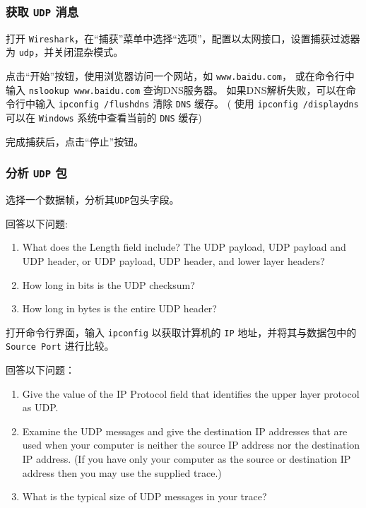 \documentclass{article}
\begin{document}
	\subsubsection{获取 \texttt{UDP} 消息}
	
	打开 \texttt{Wireshark}，在“捕获”菜单中选择“选项”，配置以太网接口，设置捕获过滤器为 \texttt{udp}，并关闭混杂模式。
	
	点击“开始”按钮，使用浏览器访问一个网站，如 \texttt{www.baidu.com}，
	或在命令行中输入 \texttt{nslookup www.baidu.com} 查询DNS服务器。
	如果DNS解析失败，可以在命令行中输入 \texttt{ipconfig /flushdns} 清除 \texttt{DNS} 缓存。
	( 使用 \texttt{ipconfig /displaydns} 可以在 \texttt{Windows} 系统中查看当前的 \texttt{DNS} 缓存)
	
	完成捕获后，点击“停止”按钮。
	
	\subsubsection{分析 \texttt{UDP} 包}
	选择一个数据帧，分析其\texttt{UDP}包头字段。
	
	回答以下问题:
	
	\begin{enumerate}[label={\arabic*})]
		\item What does the Length field include? The UDP payload, UDP payload and UDP header, or UDP payload, UDP header, and lower layer headers?
		\item How long in bits is the UDP checksum?
		\item How long in bytes is the entire UDP header? 
	\end{enumerate}
	
	打开命令行界面，输入 \texttt{ipconfig} 以获取计算机的 \texttt{IP} 地址，并将其与数据包中的 \texttt{Source Port} 进行比较。
	
	回答以下问题：
	
	\begin{enumerate}[label={\arabic*})]
		\item Give the value of the IP Protocol field that identifies the upper layer protocol as UDP.
		
		\item Examine the UDP messages and give the destination IP addresses that are used when your computer is neither the source IP address nor the destination IP address. (If you have only your computer as the source or destination IP address then you may use the supplied trace.)
		
		\item What is the typical size of UDP messages in your trace?
	\end{enumerate}
	
\end{document}
